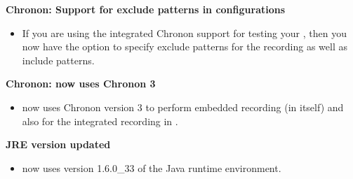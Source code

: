 \textbf{Chronon: Support for exclude patterns in \gdaut{} configurations}
\begin{itemize}
\item If you are using the integrated Chronon support for testing your \gdaut{}, then you now have the option to specify exclude patterns for the recording as well as include patterns. 
\end{itemize}

\textbf{Chronon: \app{} now uses Chronon 3}
\begin{itemize}
\item \app{} now uses Chronon version 3 to perform embedded recording (in \app{} itself) and also for the integrated recording in \gdauts{}.
\end{itemize}

\textbf{JRE version updated}
\begin{itemize}
\item \app{} now uses version 1.6.0\_33 of the Java runtime environment.
\end{itemize}



